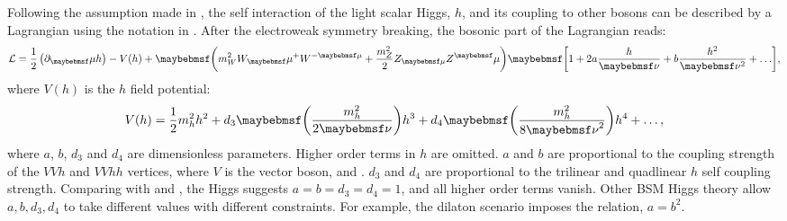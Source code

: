 Following the assumption made in  \cite{Contino:2010mh,Contino:2013gna}, the self interaction of the light scalar Higgs, $h$, and its coupling to other \SM bosons can be described by a Lagrangian using the notation in  \cite{Contino:2013gna}. After the electroweak symmetry breaking, the bosonic part of the Lagrangian reads:
\begin{equation}
\Lagr =\frac{1}{2}\left(\partial_\mu{h}\right)  - V(h) + \parenths{m_W^2{W}_\mu^+{W}^{-\mu} + \frac{m_Z^2}{2}Z_{\mu}Z^\mu}\sqbracs{1 + 2a\frac{h}{\nu} + b \frac{h^2}{\nu^2} + \hdots},
\end{equation}
where $V(h)$ is the $h$ field potential:
\begin{equation}
V(h) = \frac{1}{2}m_h^2h^2 + d_3\parenths{\frac{m_h^2}{2\nu}}h^3 + d_4\parenths{\frac{m_h^2}{8{\nu}^2}}h^4 + \hdots ,
\end{equation}
where $a$, $b$, $d_3$ and $d_4$ are  dimensionless parameters. Higher order terms in $h$ are omitted. $a$ and $b$ are proportional to the coupling strength of the $VVh$ and $VVhh$ vertices, where $V$ is the vector boson, \PWpm and \PZ. $d_3$ and $d_4$ are proportional to the trilinear and quadlinear $h$ self coupling strength. Comparing with  and , the \SM Higgs suggests $a=b=d_3=d_4=1$, and all higher order terms vanish. Other BSM Higgs theory allow $a,b,d_3,d_4$ to take different values with different constraints. For example, the dilaton scenario imposes the relation, $a = b^2$.

